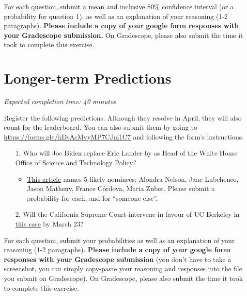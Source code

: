 \documentclass[11pt]{article}
\begin{document}
For each question, submit a mean and inclusive 80\% confidence interval (or a probability for question 1), as well as an explanation of your reasoning (1-2 paragraphs). \textbf{Please include a copy of your google form responses with your Gradescope submission.} On Gradescope, please also submit the time it took to complete this exercise.

\section*{Longer-term Predictions}

\emph{Expected completion time: 40 minutes}

Register the following predictions. Although they resolve in April, they will also count for the leaderboard. You can also submit them by going to \url{https://forms.gle/hDsAcMvyMP7CJm1C7} and following the form's instructions.


\begin{enumerate}
	\item[1.] Who will Joe Biden replace Eric Lander by as Head of the White House Office of Science and Technology Policy?
	\begin{itemize}
		\item \href{https://www.politico.com/newsletters/morning-tech/2022/02/09/the-race-to-replace-lander-at-ostp-00007114}{This article} names 5 likely nominees: Alondra Nelson, Jane Lubchenco, Jason Matheny, France C\'ordova, Maria Zuber. Please submit a probability for each, and for ``someone else''.
	\end{itemize} 
	\item[2.] Will the California Supreme Court intervene in favour of UC Berkeley in \href{https://www.berkeleyside.org/2022/02/14/uc-berkeley-enrollment-drop-court-of-appeal-ruling}{this case} by March 23?
\end{enumerate}

For each question, submit your probabilities as well as an explanation of your reasoning (1-2 paragraphs). \textbf{Please include a copy of your google form responses with your Gradescope submission} (you don't have to take a screenshot, you can simply copy-paste your reasoning and responses into the file you submit on Gradescope). On Gradescope, please also submit the time it took to complete this exercise.

\end{document}
